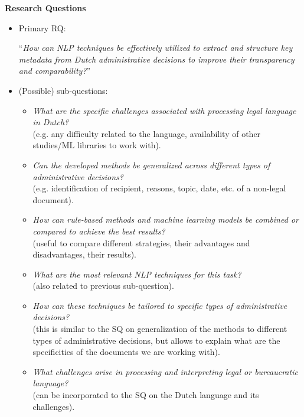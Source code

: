 \documentclass[11pt]{article}
\begin{document}
\textbf{Research Questions}
\begin{itemize}
\item Primary RQ:

“\textit{How can NLP techniques be effectively utilized to extract and structure key metadata from Dutch administrative decisions to improve their transparency and comparability?}”

\item (Possible) sub-questions:
    \begin{itemize}
        \item \textit{What are the specific challenges associated with processing legal language in Dutch?} \\ (e.g. any difficulty related to the language, availability of other studies/ML libraries to work with).
        \item \textit{Can the developed methods be generalized across different types of administrative decisions?} \\ (e.g. identification of recipient, reasons, topic, date, etc. of a non-legal document).
        \item \textit{How can rule-based methods and machine learning models be combined or compared to achieve the best results?} \\ (useful to compare different strategies, their advantages and disadvantages, their results).
        \item \textit{What are the most relevant NLP techniques for this task?} \\ (also related to previous sub-question).
        \item \textit{How can these techniques be tailored to specific types of administrative decisions?} \\(this is similar to the SQ on generalization of the methods to different types of administrative decisions, but allows to explain what are the specificities of the documents we are working with).
        \item \textit{What challenges arise in processing and interpreting legal or bureaucratic language?} \\ (can be incorporated to the SQ on the Dutch language and its challenges). 
    \end{itemize}
\end{itemize}
\end{document}
